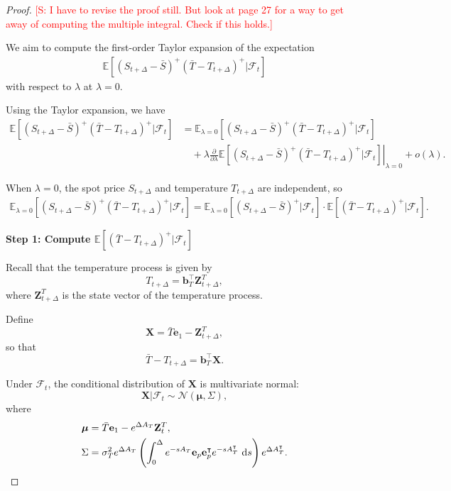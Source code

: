 \documentclass[10pt,a4paper,reqno]{amsart}
\theoremstyle{example}
\newcommand*\D{\mathop{}\!\textnormal{d}}
\newcommand{\sven}[1]{\textcolor{red}{[S: #1]}}
\begin{document}
\begin{proof}
\sven{I have to revise the proof still. But look at page 27 for a way to get
  away of computing the multiple integral. Check if this holds.}
  
We aim to compute the first-order Taylor expansion of the expectation
\begin{align}
    \mathbb{E}\left[ (S_{t+\Delta} - \bar{S})^+ (\bar{T} - T_{t+\Delta})^+ \bigg| \mathcal{F}_t \right]
\end{align}
with respect to $\lambda$ at $\lambda = 0$.

Using the Taylor expansion, we have
\begin{align}
    \mathbb{E}\left[ (S_{t+\Delta} - \bar{S})^+ (\bar{T} - T_{t+\Delta})^+ \bigg| \mathcal{F}_t \right] &= \mathbb{E}_{\lambda=0}\left[ (S_{t+\Delta} - \bar{S})^+ (\bar{T} - T_{t+\Delta})^+ \bigg| \mathcal{F}_t \right] \nonumber \\
    &\quad + \lambda \left. \frac{\partial}{\partial \lambda} \mathbb{E}\left[ (S_{t+\Delta} - \bar{S})^+ (\bar{T} - T_{t+\Delta})^+ \bigg| \mathcal{F}_t \right] \right|_{\lambda=0} + o(\lambda).
\end{align}

When $\lambda = 0$, the spot price $S_{t+\Delta}$ and temperature $T_{t+\Delta}$ are independent, so
\begin{align}
    \mathbb{E}_{\lambda=0}\left[ (S_{t+\Delta} - \bar{S})^+ (\bar{T} - T_{t+\Delta})^+ \bigg| \mathcal{F}_t \right] = \mathbb{E}_{\lambda=0}\left[ (S_{t+\Delta} - \bar{S})^+ \bigg| \mathcal{F}_t \right] \cdot \mathbb{E}\left[ (\bar{T} - T_{t+\Delta})^+ \bigg| \mathcal{F}_t \right].
\end{align}

\textbf{Step 1: Compute $\mathbb{E}\left[ (\bar{T} - T_{t+\Delta})^+ \bigg| \mathcal{F}_t \right]$}

Recall that the temperature process is given by
\[
T_{t+\Delta} = \mathbf{b}_T^\intercal \mathbf{Z}_{t+\Delta}^T,
\]
where $\mathbf{Z}_{t+\Delta}^T$ is the state vector of the temperature process.

Define
\[
\mathbf{X} = \bar{T} \mathbf{e}_1 - \mathbf{Z}_{t+\Delta}^T,
\]
so that
\[
\bar{T} - T_{t+\Delta} = \mathbf{b}_T^\intercal \mathbf{X}.
\]

Under $\mathcal{F}_t$, the conditional distribution of $\mathbf{X}$ is multivariate normal:
\[
\mathbf{X} \big| \mathcal{F}_t \sim \mathcal{N}(\boldsymbol{\mu}, \Sigma),
\]
where
\begin{align}
    \boldsymbol{\mu} &= \bar{T} \mathbf{e}_1 - e^{\Delta A_T} \mathbf{Z}_t^T, \\
    \Sigma &= \sigma_T^2 e^{\Delta A_T} \left( \int_0^\Delta e^{-s A_T} \mathbf{e}_p \mathbf{e}_p^\intercal e^{-s A_T^\intercal} \, \D s \right) e^{\Delta A_T^\intercal}.
\end{align}


\end{proof}
\end{document}
